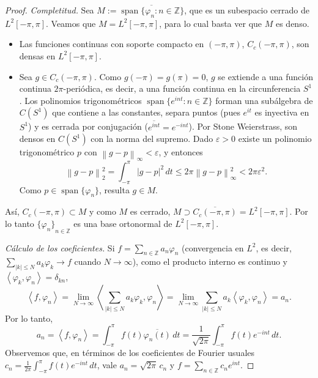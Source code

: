 \documentclass{article}
\theoremstyle{definition}
\newcommand{\Z}{\mathbb{Z}}
\newcommand{\norm}[1]{\left\lVert #1 \right\rVert}       %
\newcommand{\cl}[1]{\overline{#1}}                       %
\newcommand{\ip}[2]{\left\langle #1, #2 \right\rangle}   %
\begin{document}
\begin{proof}
	\emph{Completitud.} Sea \( M := \cl{\operatorname{span}\{\varphi_n : n \in \Z \}} \), que es un subespacio cerrado de \( L^2[-\pi, \pi] \). Veamos que \( M = L^2[-\pi, \pi] \), para lo cual basta ver que \( M \) es denso.
	\begin{itemize}
		\item Las funciones continuas con soporte compacto en \( (-\pi, \pi) \), \( C_c(-\pi, \pi) \), son densas en \( L^2[-\pi, \pi] \).
		\item Sea \( g \in C_c(-\pi, \pi) \). Como \( g(-\pi) = g(\pi) = 0 \), \( g \) se extiende a una función continua \( 2\pi \)-periódica, es decir, a una función continua en la circunferencia \( S^1 \). Los polinomios trigonométricos \( \operatorname{span}\{e^{int} : n \in \Z \} \) forman una subálgebra de \( C(S^1) \) que contiene a las constantes, separa puntos (pues \( e^{it} \) es inyectiva en \( S^1 \)) y es cerrada por conjugación (\( \overline{e^{int}} = e^{-int} \)). Por Stone Weierstrass, son densos en \( C(S^1) \) con la norma del supremo. Dado \( \varepsilon > 0 \) existe un polinomio trigonométrico \( p \) con \( \norm{g - p}_\infty < \varepsilon \), y entonces
		      \[
			      \norm{g - p}_2^2 = \int_{-\pi}^{\pi} |g - p|^2 \, dt \le 2\pi \norm{g - p}_\infty^2 < 2\pi \varepsilon^2.
		      \]
		      Como \( p \in \operatorname{span}\{\varphi_n\} \), resulta \( g \in M \).
	\end{itemize}
	Así, \( C_c(-\pi, \pi) \subset M \) y como \( M \) es cerrado, \( M \supset \cl{C_c(-\pi, \pi)} = L^2[-\pi, \pi] \). Por lo tanto \( {\{\varphi_n\}}_{n \in \Z} \) es una base ortonormal de \( L^2[-\pi, \pi] \).

	\emph{Cálculo de los coeficientes.} Si \( f = \sum_{n \in \Z} a_n \varphi_n \) (convergencia en \( L^2 \), es decir, \( \sum_{|k| \le N} a_k \varphi_k \to f \) cuando \( N \to \infty \)), como el producto interno es continuo y \( \ip{\varphi_k}{\varphi_n} = \delta_{kn} \),
	\[
		\ip{f}{\varphi_n} = \lim_{N \to \infty} \ip{\sum_{|k| \le N} a_k \varphi_k}{\varphi_n} = \lim_{N \to \infty} \sum_{|k| \le N} a_k \ip{\varphi_k}{\varphi_n} = a_n.
	\]
	Por lo tanto,
	\[
		a_n = \ip{f}{\varphi_n} = \int_{-\pi}^{\pi} f(t) \overline{\varphi_n(t)} \, dt = \frac{1}{\sqrt{2\pi}} \int_{-\pi}^{\pi} f(t) e^{-int} \, dt.
	\]
	Observemos que, en términos de los coeficientes de Fourier usuales \( c_n = \frac{1}{2\pi} \int_{-\pi}^{\pi} f(t) e^{-int} \, dt \), vale \( a_n = \sqrt{2\pi}\, c_n \) y \( f = \sum_{n \in \Z} c_n e^{int} \).
\end{proof}
\end{document}
